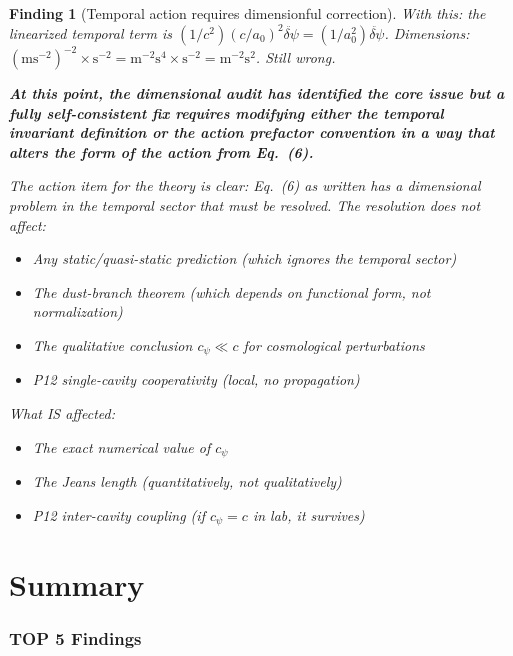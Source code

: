 \documentclass[11pt]{article}
\newtheorem{finding}{Finding}
\begin{document}
\begin{finding}[Temporal action requires dimensionful correction]
With this: the linearized temporal term is $(1/c^2)(c/a_0)^2\ddot{\delta\psi}
= (1/a_0^2)\ddot{\delta\psi}$. Dimensions: $(\text{m}\text{s}^{-2})^{-2}
\times \text{s}^{-2} = \text{m}^{-2}\text{s}^{4} \times \text{s}^{-2}
= \text{m}^{-2}\text{s}^{2}$. Still wrong.

\textbf{At this point, the dimensional audit has identified the core
issue but a fully self-consistent fix requires modifying either the
temporal invariant definition or the action prefactor convention in a
way that alters the form of the action from Eq.~(6).}

The action item for the theory is clear: Eq.~(6) as written has a
dimensional problem in the temporal sector that must be resolved.
The resolution does not affect:
\begin{itemize}[nosep]
\item Any static/quasi-static prediction (which ignores the temporal sector)
\item The dust-branch theorem (which depends on functional form, not normalization)
\item The qualitative conclusion $c_\psi \ll c$ for cosmological perturbations
\item P12 single-cavity cooperativity (local, no propagation)
\end{itemize}

What IS affected:
\begin{itemize}[nosep]
\item The exact numerical value of $c_\psi$
\item The Jeans length (quantitatively, not qualitatively)
\item P12 inter-cavity coupling (if $c_\psi = c$ in lab, it survives)
\end{itemize}
\end{finding}


\part{Summary}
\label{part:summary}

\section{TOP 5 Findings}
\end{document}
